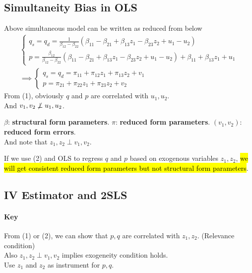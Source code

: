 \documentclass[]{article}
\begin{document}
		\subsection{Simultaneity Bias in OLS}
			\par Above simultaneous model can be written as reduced from below
			\begin{gather}
				\begin{cases}
					q_s = q_d = \frac{1}{\beta_{12} - \beta_{22}} (\beta_{11} - \beta_{21} + \beta_{13} z_1 - \beta_{23}z_2 + u_1 - u_2)\\
					p = \frac{\beta_{12}}{\beta_{12} - \beta_{22}} (\beta_{11} - \beta_{21} + \beta_{13} z_1 - \beta_{23}z_2 + u_1 - u_2) + \beta_{11} + \beta_{13}z_1 + u_1
				\end{cases} \\
				\implies \begin{cases}
					q_s = q_d = \pi_{11} + \pi_{12} z_1 + \pi_{13} z_2 + v_1 \\
					p = \pi_{21} + \pi_{22} z_1 + \pi_{23} z_2 + v_2
				\end{cases}
			\end{gather}
			From (1), obviously $q$ and $p$ are correlated with $u_1,u_2$. \\
			And $v_1, v_2 \centernot \perp u_1, u_2$. \\
			\begin{notation}
					$\beta$: \textbf{structural form parameters}.
					$\pi$: \textbf{reduced form parameters}.
					$(v_1, v_2)$: \textbf{reduced form errors}. \\
				And note that $z_1, z_2 \perp v_1, v_2$.
			\end{notation}
			If we use (2) and OLS to regress $q$ and $p$ based on exogenous variables $z_1, z_2$, \hl{we will get consistent reduced form parameters but not structural form parameters}.
		\subsection{IV Estimator and 2SLS}
			\paragraph{Key} From (1) or (2), we can show that $p, q$ are correlated with $z_1, z_2$. (Relevance condition) \\
			Also $z_1, z_2 \perp v_1, v_2$ implies exogeneity condition holds. \\
			Use $z_1$ and $z_2$ as instrument for $p, q$.
\end{document}
